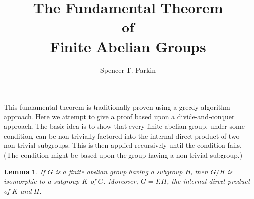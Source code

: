\documentclass[12pt]{article}
\title{The Fundamental Theorem\\of\\Finite Abelian Groups}
\author{Spencer T. Parkin}
\newtheorem{lemma}{Lemma}[section]
\begin{document}
\maketitle

This fundamental theorem is traditionally proven using a greedy-algorithm approach.
Here we attempt to give a proof based upon a divide-and-conquer approach.
The basic idea is to show that every finite abelian group, under some condition, can be non-trivially
factored into the internal direct product of two non-trivial subgroups.  This is then applied recursively
until the condition fails.  (The condition might be based upon the group having a non-trivial subgroup.)

\begin{lemma}\label{lem_factor_group}
If $G$ is a finite abelian group having a subgroup $H$, then
$G/H$ is isomorphic to a subgroup $K$ of $G$.
Moreover, $G=KH$, the internal direct product of $K$ and $H$.
\end{lemma}
\end{document}
